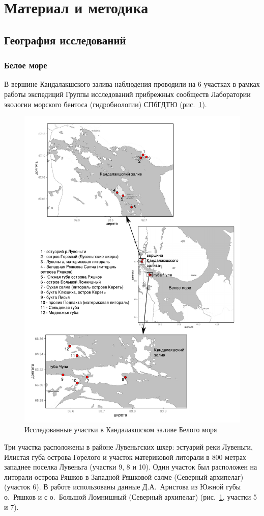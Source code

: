 \section{Материал и методика}
	\subsection{География исследований}

		\subsubsection{Белое море}
В вершине Кандалакшского залива наблюдения проводили на $6$ участках в рамках работы экспедиций Группы исследований прибрежных сообществ Лаборатории экологии морского бентоса (гидробиологии) СПбГДТЮ (рис.~\ref{ris:karta_White}). 
	\begin{figure}[p]
    \includegraphics[width=\textwidth]{../maps/White_sea1.pdf}
    \caption{Исследованные участки в Кандалакшском заливе Белого моря}
    \label{ris:karta_White}
	\end{figure}
Три участка расположены в районе Лувеньгских шхер: эстуарий реки Лувеньги, Илистая губа острова Горелого и участок материковой литорали в $800$ метрах западнее поселка Лувеньга (участки 9, 8 и 10).
Один участок был расположен на литорали острова Ряшков в Западной Ряшковой салме (Северный архипелаг) (участок 6).
В работе использованы данные Д.\:А.~Аристова из Южной губы о.~Ряшков и с о.~Большой Ломнишный (Северный архипелаг) (рис.~\ref{ris:karta_White}, участки 5 и 7). 

